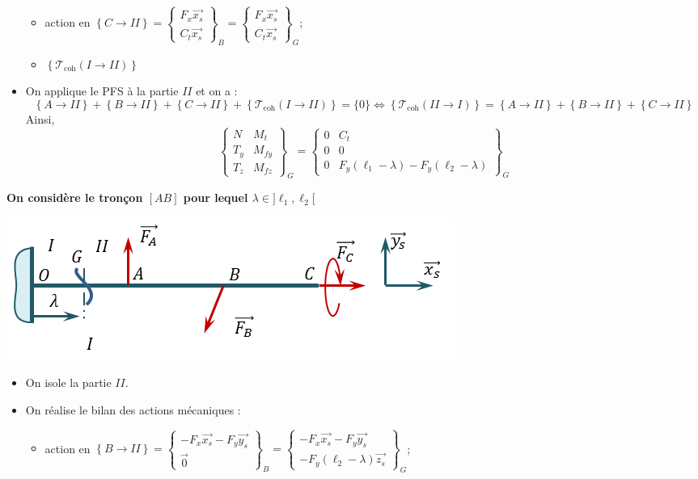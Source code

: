 \documentclass[10pt,fleqn]{article} %
\begin{document}
\begin{multicols}{2}
\begin{itemize}
\begin{itemize}
\item action en $\left\{ C \rightarrow II \right\}= \begin{Bmatrix} F_x\overrightarrow{x_s}\\
C_t\overrightarrow{x_s}\end{Bmatrix}_B= \begin{Bmatrix} F_x\overrightarrow{x_s}\\
C_t\overrightarrow{x_s}\end{Bmatrix}_G$;
\item $\left\{ \mathcal{T}_{\text{coh}} \left(I \rightarrow II\right) \right\}$
\end{itemize}
\item On applique le PFS à la partie $II$ et on a : 
$$
\left\{ A\rightarrow II \right\} + \left\{ B\rightarrow II \right\} + \left\{ C\rightarrow II \right\}
+\left\{ \mathcal{T}_{\text{coh}} \left(I \rightarrow II\right) \right\} = \{0\}
\Leftrightarrow
\left\{ \mathcal{T}_{\text{coh}} \left(II \rightarrow I\right) \right\}  = \left\{ A\rightarrow II \right\} + \left\{ B\rightarrow II \right\} + \left\{ C\rightarrow II \right\}
$$ 
Ainsi, 
$$
\begin{Bmatrix} 
N & M_t \\
T_y & M_{fy} \\
T_z & M_{fz} 
\end{Bmatrix}_G
=
\begin{Bmatrix} 
0 & C_t \\
0& 0 \\
0 & F_y\left( \ell_1 - \lambda \right) -F_y\left( \ell_2 - \lambda \right) 
\end{Bmatrix}_G
$$
\end{itemize}



\textbf{On considère le tronçon $[AB]$ pour lequel $\lambda \in ]\ell_1,\ell_2[$}
\begin{center}
\includegraphics[width=.5\linewidth]{images/corr_01}
\end{center}
\begin{itemize}
\item On isole la partie $II$. 
\item On réalise le bilan des actions mécaniques : 
\begin{itemize}
\item action en $\left\{ B\rightarrow II \right\}= \begin{Bmatrix} -F_x\overrightarrow{x_s}-F_y\overrightarrow{y_s}\\
\overrightarrow{0}\end{Bmatrix}_B= \begin{Bmatrix}-F_x\overrightarrow{x_s}-F_y\overrightarrow{y_s}\\
 -F_y\left( \ell_2 - \lambda \right)\overrightarrow{z_s}\end{Bmatrix}_G$;


\end{itemize}
\end{itemize}
\end{multicols}
\end{document}
